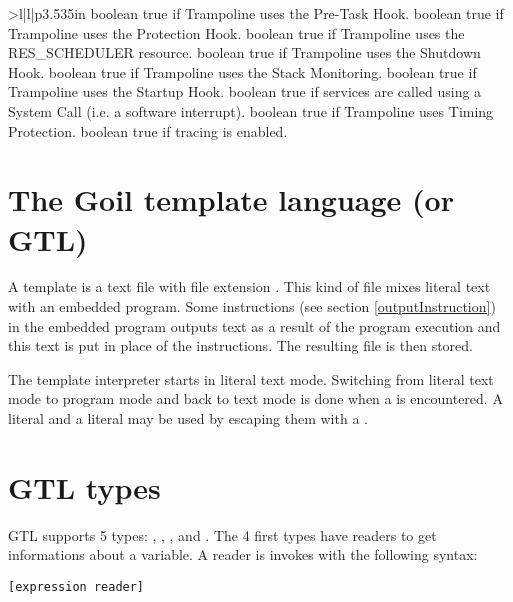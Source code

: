 \begin{sortedtable}{>{\va}l|l|p{3.535in}}
{boolean}
{true if Trampoline uses the Pre-Task Hook.} 
{boolean}
{true if Trampoline uses the Protection Hook.} 
{boolean}
{true if Trampoline uses the RES_SCHEDULER resource.} 
{boolean}
{true if Trampoline uses the Shutdown Hook.} 
{boolean}
{true if Trampoline uses the Stack Monitoring.} 
{boolean}
{true if Trampoline uses the Startup Hook.} 
{boolean}
{true if services are called using a System Call (i.e. a software interrupt).} 
{boolean}
{true if Trampoline uses Timing Protection.} 
{boolean}
{true if tracing is enabled.} 
\end{sortedtable}


\section{The Goil template language (or GTL)}
\label{sec:goiltemplateslanguage}

A template is a text file with file extension . This kind of file mixes literal text with an embedded program. Some instructions (see section \ref{outputInstruction}) in the embedded program outputs text as a result of the program execution and this text is put in place of the instructions. The resulting file is then stored.

The template interpreter starts in literal text mode. Switching from literal text mode to program mode and back to text mode is done when a \character{\%} is encountered. A literal \character{\%} and a literal \character{\textbackslash} may be used by escaping them with a \character{\textbackslash}.

\section{GTL types}

GTL supports 5 types: , , ,  and . The 4 first types have readers %
to get informations about a variable. A reader is invokes with the following syntax:

\begin{lstlisting}[language=goilTemplate]
[expression reader]
\end{lstlisting}

